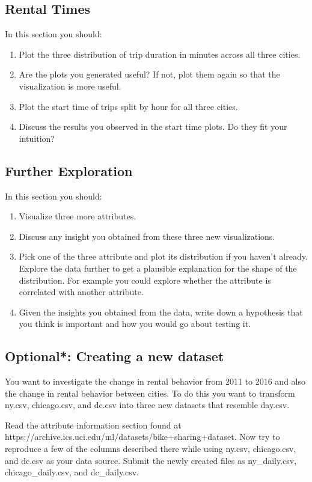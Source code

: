 \documentclass[12pt, answers, addpoints]{exam}
\begin{document}
\subsection{Rental Times}
In this section you should:
\begin{enumerate}
    \item Plot the three distribution of trip duration in minutes across all three cities.
    \item Are the plots you generated useful? If not, plot them again so that the visualization is more useful.
    \item Plot the start time of trips split by hour for all three cities.
    \item Discuss the results you observed in the start time plots. Do they fit your intuition?
\end{enumerate}

\subsection{Further Exploration}
In this section you should:
\begin{enumerate}
    \item Visualize three more attributes.
    \item Discuss any insight you obtained from these three new visualizations.
    \item Pick one of the three attribute and plot its distribution if you haven't already. Explore the data further to get a plausible explanation for the shape of the distribution. For example you could explore whether the attribute is correlated with another attribute.
    \item Given the insights you obtained from the data, write down a hypothesis that you think is important and how you would go about testing it.
\end{enumerate}

\subsection{Optional*: Creating a new dataset}
You want to investigate the change in rental behavior from 2011 to 2016 and also the change in rental behavior between cities. To do this you want to transform ny.csv, chicago.csv, and dc.csv into three new datasets that resemble day.csv.

Read the attribute information section found at \\https://archive.ics.uci.edu/ml/datasets/bike+sharing+dataset. Now try to reproduce a few of the columns described there while using ny.csv, chicago.csv, and dc.csv as your data source. Submit the newly created files as ny\_daily.csv, chicago\_daily.csv, and dc\_daily.csv.
\end{document}
